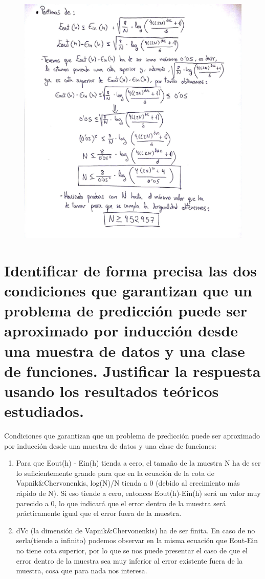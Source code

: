 \begin{figure}[H] %
	\centering
	\includegraphics[scale=0.230]{imagenes/5} 
\end{figure}





\section{ Identificar de forma precisa las dos condiciones que garantizan que un problema de predicción puede ser aproximado por inducción desde una muestra de datos y una clase de funciones. Justificar la respuesta usando los resultados teóricos estudiados.}

Condiciones que garantizan que un problema de predicción puede ser aproximado por inducción desde una muestra de datos y una clase de funciones:

\begin{enumerate}
	\item Para que Eout(h) - Ein(h) tienda a cero, el tamaño de la muestra N ha de ser lo suficientemente grande para que en la ecuación de la cota de Vapnik\&Chervonenkis, log(N)/N tienda a 0 (debido al crecimiento más rápido de N). Si eso tiende a cero, entonces Eout(h)-Ein(h) será un valor muy parecido a 0, lo que indicará que el error dentro de la muestra será prácticamente igual que el error fuera de la muestra.
	\item dVc (la dimensión de Vapnik\&Chervonenkis) ha de ser finita. En caso de no serla(tiende a infinito) podemos observar en la misma ecuación que Eout-Ein no tiene cota superior, por lo que se nos puede presentar el caso de que el error dentro de la muestra sea muy inferior al error existente fuera de la muestra, cosa que para nada nos interesa.
\end{enumerate}

